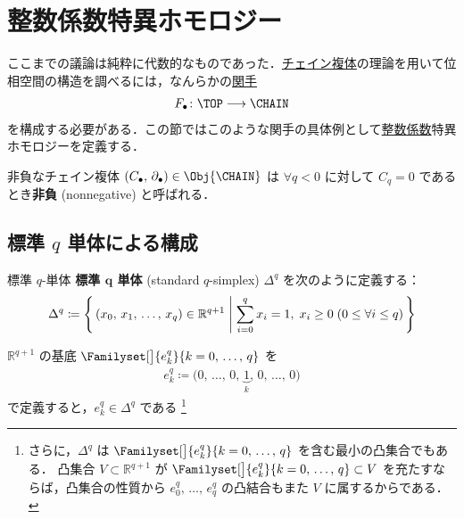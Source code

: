 \documentclass[algtopo_main]{subfiles}
\begin{document}



\section{整数係数特異ホモロジー}

ここまでの議論は純粋に代数的なものであった．\hyperref[def:CC]{チェイン複体}の理論を用いて位相空間の構造を調べるには，なんらかの\hyperref[def:functor]{関手}
\begin{align}
    F_\bullet \colon \TOP \lto \CHAIN
\end{align}
を構成する必要がある．この節ではこのような関手の具体例として\underline{整数係数}特異ホモロジーを定義する．

\begin{mydef}[label=def:CC-nn]{非負なチェイン複体}
    $(C_\bullet,\, \partial_\bullet) \in \Obj{\CHAIN}$ は $\forall q < 0$ に対して $C_q = 0$ であるとき\textbf{非負} (nonnegative) と呼ばれる．
\end{mydef}

\subsection{標準 $q$ 単体による構成}

\begin{mydef}[label=def:stdsimplex]{標準 $q$-単体}
    \textbf{標準 $\bm{q}$ 単体} (standard $q$-simplex) $\Delta^q$ を次のように定義する：
    \begin{align}
        \Delta^q \coloneqq \Biggl\{\, (x_0,\, x_1,\, \dots,\, x_q) \in \mathbb{R}^{q+1} \Biggm| \sum_{i=0}^q x_i = 1,\; x_i \ge 0\;(0\le \forall i \le q) \,\Biggr\} 
    \end{align}
\end{mydef}

$\mathbb{R}^{q+1}$ の基底 $\Familyset[\big]{e^q_k}{k=0,\, \dots,\, q}$ を
\begin{align}
    e^q_k \coloneqq \bigl( 0,\, \dots,\, 0,\, \underbrace{1}_{k},\, 0,\, \dots,\, 0 \bigr) 
\end{align}
で定義すると，$e^q_k \in \Delta^q$ である
\footnote{
    さらに，$\Delta^q$ は  $\Familyset[\big]{e^q_k}{k=0,\, \dots,\, q}$ を含む最小の凸集合でもある．
    凸集合 $V \subset \mathbb{R}^{q+1}$ が $\Familyset[\big]{e^q_k}{k=0,\, \dots,\, q} \subset V$ を充たすならば，凸集合の性質から $e^q_0,\, \dots,\, e^q_q$ の凸結合もまた $V$ に属するからである．
}
\end{document}

